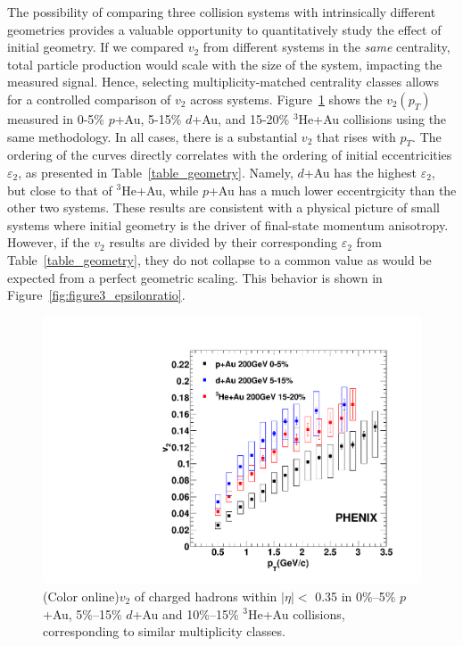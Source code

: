 \documentclass[%
reprint,
showpacs,preprintnumbers,
 amsmath,amssymb,
 aps,
]{revtex4-1}
\newcommand{\pt}{\mbox{$p_T$}\xspace}
\newcommand{\dau}{\mbox{$d$+Au}\xspace}
\newcommand{\pau}{\mbox{$p$+Au}\xspace}
\newcommand{\hau}{\mbox{$^3\text{He}$+Au}\xspace}
\begin{document}
The possibility of comparing three collision systems with intrinsically different geometries provides a valuable opportunity to quantitatively study the effect of initial geometry. If we compared $v_2$ from different systems in the \emph{same} centrality, total particle production would scale with the size of the system, impacting the measured signal. 
Hence, selecting multiplicity-matched centrality classes allows for a controlled comparison of $v_2$ across systems. Figure~\ref{fig:figure3} shows the $v_2(\pt)$ measured in 0-5\% \pau, 5-15\% \dau, and 15-20\% \hau collisions using the same methodology. In all cases, there is a substantial $v_2$ that rises with \pt. The ordering of the curves directly correlates with the ordering of initial eccentricities $\varepsilon_2$, as presented in Table~\ref{table_geometry}. Namely, \dau has the highest $\varepsilon_2$, but close to that of \hau, while \pau has a much lower eccentrgicity than the other two systems. These results are consistent with a physical picture of small systems where initial geometry is the driver of final-state momentum anisotropy. However, if the $v_2$ results are divided by their corresponding $\varepsilon_2$ from Table~\ref{table_geometry}, they do not collapse to a common value as would be expected from a perfect geometric scaling. This behavior is shown in Figure~\ref{fig:figure3_epsilonratio}.

\begin{figure}[htbp]
  \includegraphics[scale=0.45]{Figures/figure3.pdf}
  \caption{(Color online)$v_2$ of charged hadrons within $|\eta| <$ 0.35 in 0\%--5\% \pau, 5\%--15\% \dau and 10\%--15\% \hau collisions, corresponding to similar multiplicity classes.}
\label{fig:figure3}
\end{figure}
\end{document}
